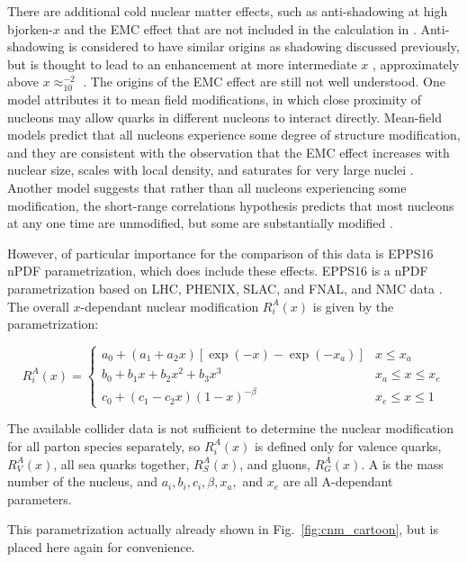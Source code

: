 {  There are additional cold nuclear matter effects, such as anti-shadowing at high bjorken-$x$ and the EMC effect that are not included in the calculation in \cite{Kang2012}. Anti-shadowing is considered to have similar origins as shadowing discussed previously, but is thought to lead to an enhancement at more intermediate $x$ \cite{Brodsky1990a}, approximately above $x\approx_10^{-2}$ \cite{epps16:2017}. The origins of the EMC effect are still not well understood. One model attributes it to mean field modifications, in which close proximity of nucleons may allow quarks in different nucleons to interact directly. Mean-field models predict that all nucleons experience some degree of structure modification, and they are consistent with the observation that the EMC effect increases with nuclear size, scales with local density, and saturates for very large nuclei \cite{Hen2017a}. Another model suggests that rather than all nucleons experiencing some modification, the short-range correlations hypothesis predicts that most nucleons at any one time are unmodified, but some are substantially modified \cite{Norton2003a}.

However, of particular importance for the comparison of this data is EPPS16 nPDF parametrization, which does include these effects. EPPS16 is a nPDF parametrization based on LHC, PHENIX, SLAC, and FNAL, and NMC data \cite{epps16:2017}. The overall $x$-dependant nuclear modification $R_{i}^{A}(x)$ is given by the parametrization:

\begin{equation}
  R_{i}^{A}(x)=\left\{\begin{array}{ll}
      a_{0}+\left(a_{1}+a_{2} x\right)\left[\exp (-x)-\exp \left(-x_{a}\right)\right] & x \leq x_{a} \\
      b_{0}+b_{1} x+b_{2} x^{2}+b_{3} x^{3} & x_{a} \leq x \leq x_{e} \\
      c_{0}+\left(c_{1}-c_{2} x\right)(1-x)^{-\beta} & x_{e} \leq x \leq 1
  \end{array}\right.
\end{equation}

The available collider data is not sufficient to determine the nuclear modification for all parton species separately, so $R_{i}^{A}(x)$ is defined only for valence quarks,  $R_{V}^{A}(x)$, all sea quarks together,  $R_{S}^{A}(x)$, and gluons,  $R_{G}^{A}(x)$. A is the mass number of the nucleus, and  $a_i, b_i, c_i, \beta, x_a,$ and $x_e$ are all A-dependant parameters. 

This parametrization actually already shown in Fig.~\ref{fig:cnm_cartoon}, but is placed here again for convenience.

}
